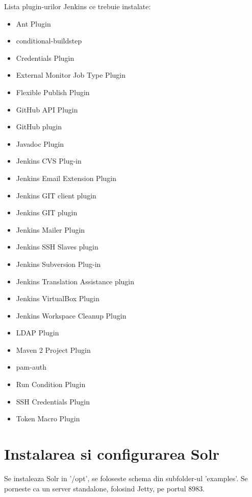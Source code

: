 Lista plugin-urilor Jenkins ce trebuie instalate:
\begin{itemize}
\item 
Ant Plugin
\item
conditional-buildstep
\item
Credentials Plugin
\item
External Monitor Job Type Plugin
\item
Flexible Publish Plugin
\item
GitHub API Plugin
\item
GitHub plugin
\item
Javadoc Plugin
\item
Jenkins CVS Plug-in
\item
Jenkins Email Extension Plugin
\item
Jenkins GIT client plugin
\item
Jenkins GIT plugin
\item
Jenkins Mailer Plugin
\item
Jenkins SSH Slaves plugin
\item
Jenkins Subversion Plug-in
\item
Jenkins Translation Assistance plugin
\item
Jenkins VirtualBox Plugin
\item
Jenkins Workspace Cleanup Plugin
\item
LDAP Plugin
\item
Maven 2 Project Plugin
\item
pam-auth
\item
Run Condition Plugin
\item
SSH Credentials Plugin
\item
Token Macro Plugin
\end{itemize}


\section{Instalarea si configurarea Solr}

Se instaleaza Solr in '/opt', se foloseste schema din subfolder-ul
'examples'. Se porneste ca un server standalone, folosind Jetty, pe portul 8983.
